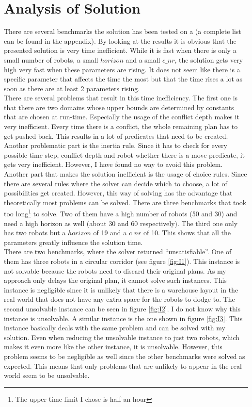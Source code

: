 \documentclass[runningheads]{llncs}
\begin{document}
\section{Analysis of Solution}
There are several benchmarks the solution has been tested on a (a complete list can be found in the appendix). By looking at the results it is obvious that the presented solution is very time inefficient. While it is fast when there is only a small number of robots, a small $horizon$ and a small $c\_nr$, the solution gets very high very fast when these parameters are rising. It does not seem like there is a specific parameter that affects the time the most but that the time rises a lot as soon as there are at least 2 parameters rising. \\
There are several problems that result in this time inefficiency. The first one is that there are two domains whose upper bounds are determined by constants that are chosen at run-time. Especially the usage of the conflict depth makes it very inefficient. Every time there is a conflict, the whole remaining plan has to get pushed back. This results in a lot of predicates that need to be created. Another problematic part is the inertia rule. Since it has to check for every possible time step, conflict depth and robot whether there is a move predicate, it gets very inefficient. However, I have found no way to avoid this problem. \\
Another part that makes the solution inefficient is the usage of choice rules. Since there are several rules where the solver can decide which to choose, a lot of possibilities get created. However, this way of solving has the advantage that theoretically most problems can be solved. 
There are three benchmarks that took too long\footnote{The upper time limit I chose is half an hour} to solve. Two of them have a high number of robots (50 and 30) and need a high horizon as well (about 30 and 60 respectively). The third one only has two robots but a $horizon$ of 19 and a $c\_nr$ of 10. This shows that all the parameters greatly influence the solution time. \\
There are two benchmarks, where the solver returned ``unsatisfiable''. One of them has three robots in a circular corridor (see figure \ref{fig:I1}). This instance is not solvable because the robots need to discard their original plans. As my approach only delays the original plan, it cannot solve such instances. This instance is negligible since it is unlikely that there is a warehouse layout in the real world that does not have any extra space for the robots to dodge to. The second unsolvable instance can be seen in figure \ref{fig:I2}. I do not know why this instance is unsolvable. A similar instance is the one shown in figure \ref{fig:I3}. This instance basically deals with the same problem and can be solved with my solution. Even when reducing the unsolvable instance to just two robots, which makes it even more like the other instance, it is unsolvable. However, this problem seems to be negligible as well since the other benchmarks were solved as expected. This means that only problems that are unlikely to appear in the real world seem to be unsolvable. \\
\end{document}

